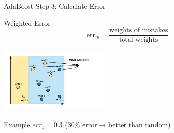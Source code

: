 \documentclass[8pt]{beamer}
\newcommand{\fitpic}[1]{\begin{adjustbox}{max width=\linewidth, max totalheight=0.78\textheight}#1\end{adjustbox}}
\begin{document}
\begin{frame}{AdaBoost Step 3: Calculate Error}
\begin{definitionbox}{Weighted Error}
$$\text{err}_m = \frac{\text{weights of mistakes}}{\text{total weights}}$$
\end{definitionbox}

\begin{center}
\fitpic{\includegraphics[width = 0.4\textwidth]{../assets/ensemble/diagrams/ada_iter1_misclassify}}
\end{center}

\begin{examplebox}{Example}
$err_1 = 0.3$ (30\% error → better than random)
\end{examplebox}
\end{frame}
\end{document}
